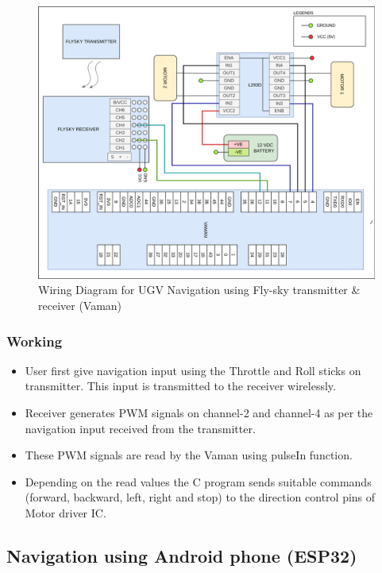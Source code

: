 \begin{figure}[h!]
\centering
\includegraphics[width=\columnwidth]{./Figures/Wiring_UGV_flysky_Vaman.png}
\caption{Wiring Diagram for UGV Navigation using Fly-sky transmitter \& receiver (Vaman)}
\label{Wiring_UGV_flysky_Vaman}
\end{figure}

\subsubsection{Working}
\begin{itemize}
    \item User first give navigation input using the Throttle and Roll sticks on transmitter. This input is transmitted to the receiver wirelessly.
    \item Receiver generates PWM signals on channel-2 and channel-4 as per the navigation input received from the transmitter.
    \item These PWM signals are read by the Vaman using pulseIn function.
    \item Depending on the read values the C program sends suitable commands (forward, backward, left, right and stop) to the direction control pins of Motor driver IC.
\end{itemize}

\subsection{Navigation using Android phone (ESP32)} 
